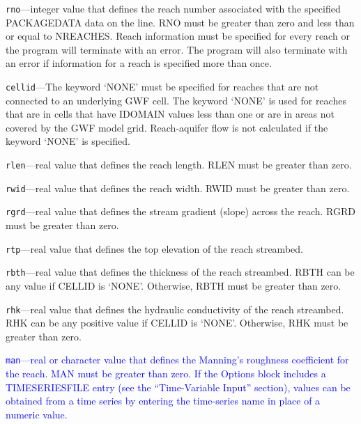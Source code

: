 \begin{description}
\item \texttt{rno}---integer value that defines the reach number associated with the specified PACKAGEDATA data on the line. RNO must be greater than zero and less than or equal to NREACHES. Reach information must be specified for every reach or the program will terminate with an error.  The program will also terminate with an error if information for a reach is specified more than once.

\item \texttt{cellid}---The keyword `NONE' must be specified for reaches that are not connected to an underlying GWF cell. The keyword `NONE' is used for reaches that are in cells that have IDOMAIN values less than one or are in areas not covered by the GWF model grid. Reach-aquifer flow is not calculated if the keyword `NONE' is specified.

\item \texttt{rlen}---real value that defines the reach length. RLEN must be greater than zero.

\item \texttt{rwid}---real value that defines the reach width. RWID must be greater than zero.

\item \texttt{rgrd}---real value that defines the stream gradient (slope) across the reach. RGRD must be greater than zero.

\item \texttt{rtp}---real value that defines the top elevation of the reach streambed.

\item \texttt{rbth}---real value that defines the thickness of the reach streambed. RBTH can be any value if CELLID is `NONE'. Otherwise, RBTH must be greater than zero.

\item \texttt{rhk}---real value that defines the hydraulic conductivity of the reach streambed. RHK can be any positive value if CELLID is `NONE'. Otherwise, RHK must be greater than zero.

\item \textcolor{blue}{\texttt{man}---real or character value that defines the Manning's roughness coefficient for the reach. MAN must be greater than zero.  If the Options block includes a TIMESERIESFILE entry (see the ``Time-Variable Input'' section), values can be obtained from a time series by entering the time-series name in place of a numeric value.}


\end{description}
